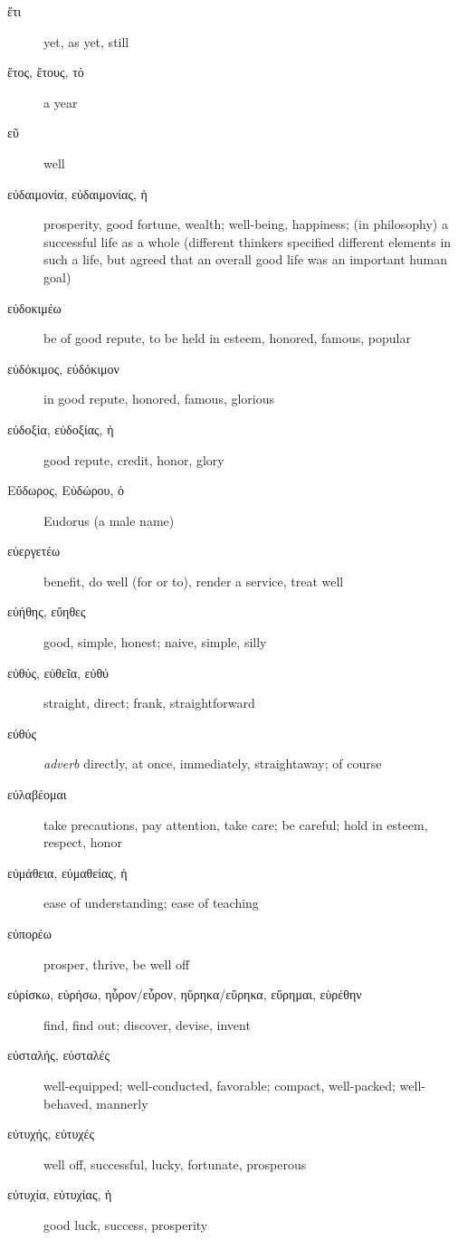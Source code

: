 \documentclass[12pt,letterpaper]{article}
\begin{document}
\begin{description}
    \item[\textgreek{ἔτι}] \marginnote{*}yet, as yet, still
    \item[\textgreek{ἔτος, ἔτους, τό}] \marginnote{*}a year
    \item[\textgreek{εῦ}] \marginnote{*}well
    \item[\textgreek{εὐδαιμονία, εὐδαιμονίας, ἡ}] prosperity, good fortune, wealth; well-being, happiness; (in philosophy) a successful life as a whole (different thinkers specified different elements in such a life, but agreed that an overall good life was an important human goal)
    \item[\textgreek{εὐδοκιμέω}] be of good repute, to be held in esteem, honored, famous, popular
    \item[\textgreek{εὐδόκιμος, εὐδόκιμον}] in good repute, honored, famous, glorious
    \item[\textgreek{εὐδοξία, εὐδοξίας, ἡ}] good repute, credit, honor, glory
    \item[\textgreek{Εὔδωρος, Εὐδώρου, ὁ}] Eudorus (a male name)
    \item[\textgreek{εὐεργετέω}] benefit, do well (for or to), render a service, treat well
    \item[\textgreek{εὐήθης, εὔηθες}] good, simple, honest; naive, simple, silly
    \item[\textgreek{εὐθύς, εὐθεῖα, εὐθύ}] \marginnote{*}straight, direct; frank, straightforward
    \item[\textgreek{εὐθύς}] \marginnote{*}\textit{adverb} directly, at once, immediately, straightaway; of course
    \item[\textgreek{εὐλαβέομαι}] take precautions, pay attention, take care; be careful; hold in esteem, respect, honor
    \item[\textgreek{εὐμάθεια, εὐμαθείας, ἡ}] ease of understanding; ease of teaching
    \item[\textgreek{εὐπορέω}] prosper, thrive, be well off
    \item[\textgreek{εὑρίσκω, εὑρήσω, ηὗρον/εὗρον, ηὕρηκα/εὕρηκα, εὕρημαι, εὑρέθην}] \marginnote{*}find, find out; discover, devise, invent
    \item[\textgreek{εὐσταλής, εὐσταλές}] well-equipped; well-conducted, favorable; compact, well-packed; well-behaved, mannerly
    \item[\textgreek{εὐτυχής, εὐτυχές}] well off, successful, lucky, fortunate, prosperous
    \item[\textgreek{εὐτυχία, εὐτυχίας, ἡ}] good luck, success, prosperity

\end{description}
\end{document}
